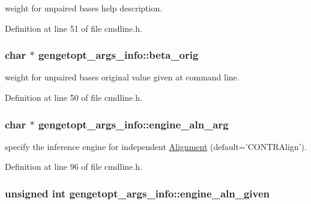 weight for unpaired bases help description. 



Definition at line 51 of file cmdline.\+h.

\hypertarget{structgengetopt__args__info_a13737dc4f85cd3276f8cbb66e796a11d}{
\subsubsection[{beta\+\_\+orig}]{\setlength{\rightskip}{0pt plus 5cm}char $\ast$ gengetopt\+\_\+args\+\_\+info\+::beta\+\_\+orig}}\label{structgengetopt__args__info_a13737dc4f85cd3276f8cbb66e796a11d}


weight for unpaired bases original value given at command line. 



Definition at line 50 of file cmdline.\+h.

\hypertarget{structgengetopt__args__info_a80b9792246c023eb1ddd04336b226c1a}{
\subsubsection[{engine\+\_\+aln\+\_\+arg}]{\setlength{\rightskip}{0pt plus 5cm}char $\ast$ gengetopt\+\_\+args\+\_\+info\+::engine\+\_\+aln\+\_\+arg}}\label{structgengetopt__args__info_a80b9792246c023eb1ddd04336b226c1a}


specify the inference engine for independent \hyperlink{class_alignment}{Alignment} (default='C\+O\+N\+T\+R\+Align'). 



Definition at line 96 of file cmdline.\+h.

\hypertarget{structgengetopt__args__info_aabfb2ac097b504732bb06e9fec3ab25c}{
\subsubsection[{engine\+\_\+aln\+\_\+given}]{\setlength{\rightskip}{0pt plus 5cm}unsigned int gengetopt\+\_\+args\+\_\+info\+::engine\+\_\+aln\+\_\+given}}\label{structgengetopt__args__info_aabfb2ac097b504732bb06e9fec3ab25c}


